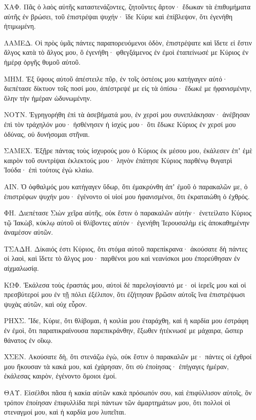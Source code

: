 {\par }{\PP {}ΧΑΦ. Πᾶς ὁ λαὸς αὐτῆς καταστενάζοντες, ζητοῦντες ἄρτον· ἔδωκαν τὰ ἐπιθυμήματα αὐτῆς ἐν βρώσει, τοῦ ἐπιστρέψαι ψυχήν· ἴδε Κύριε καὶ ἐπίβλεψον, ὅτι ἐγενήθη ἠτιμωμένη.
\par }{\PP {}ΛΑΜΕΔ. Οἱ πρὸς ὑμᾶς πάντες παραπορευόμενοι ὁδὸν, ἐπιστρέψατε καὶ ἴδετε εἰ ἔστιν ἄλγος κατὰ τὸ ἄλγος μου, ὃ ἐγενήθη· φθεγξάμενος ἐν ἐμοὶ ἐταπείνωσέ με Κύριος ἐν ἡμέρᾳ ὀργῆς θυμοῦ αὐτοῦ.
\par }{\PP {}ΜΗΜ. Ἐξ ὕψους αὐτοῦ ἀπέστειλε πῦρ, ἐν τοῖς ὀστέοις μου κατήγαγεν αὐτό· διεπέτασε δίκτυον τοῖς ποσί μου, ἀπέστρεψέ με εἰς τὰ ὀπίσω· ἔδωκέ με ἠφανισμένην, ὅλην τὴν ἡμέραν ὠδυνωμένην.
\par }{\PP {}ΝΟΥΝ. Ἐγρηγορήθη ἐπὶ τὰ ἀσεβήματά μου, ἐν χερσί μου συνεπλάκησαν· ἀνέβησαν ἐπὶ τὸν τράχηλόν μου· ἠσθένησεν ἡ ἰσχύς μου· ὅτι ἔδωκε Κύριος ἐν χερσί μου ὀδύνας, οὐ δυνήσομαι στῆναι.
\par }{\PP {}ΣΑΜΕΧ. Ἐξῇρε πάντας τοὺς ἰσχυρούς μου ὁ Κύριος ἐκ μέσου μου, ἐκάλεσεν ἐπʼ ἐμὲ καιρὸν τοῦ συντρίψαι ἐκλεκτούς μου· ληνὸν ἐπάτησε Κύριος παρθένῳ θυγατρὶ Ἰούδα· ἐπὶ τούτοις ἐγὼ κλαίω.
\par }{\PP {}ΑΙΝ. Ὁ ὀφθαλμός μου κατήγαγεν ὕδωρ, ὅτι ἐμακρύνθη ἀπʼ ἐμοῦ ὁ παρακαλῶν με, ὁ ἐπιστρέφων ψυχήν μου· ἐγένοντο οἱ υἱοί μου ἠφανισμένοι, ὅτι ἐκραταιώθη ὁ ἐχθρός.
\par }{\PP {}ΦΗ. Διεπέτασε Σιὼν χεῖρα αὐτῆς, οὐκ ἔστιν ὁ παρακαλῶν αὐτήν· ἐνετείλατο Κύριος τῷ Ἰακὼβ, κύκλῳ αὐτοῦ οἱ θλίβοντες αὐτόν· ἐγενήθη Ἱερουσαλὴμ εἰς ἀποκαθημένην ἀναμέσον αὐτῶν.
\par }{\PP {}ΤΣΑΔΗ. Δίκαιός ἐστι Κύριος, ὅτι στόμα αὐτοῦ παρεπίκρανα· ἀκούσατε δὴ πάντες οἱ λαοὶ, καὶ ἴδετε τὸ ἄλγος μου· παρθένοι μου καὶ νεανίσκοι μου ἐπορεύθησαν ἐν αἰχμαλωσίᾳ.
\par }{\PP {}ΚΩΦ. Ἐκάλεσα τοὺς ἐραστάς μου, αὐτοὶ δὲ παρελογίσαντό με· οἱ ἱερεῖς μου καὶ οἱ πρεσβύτεροί μου ἐν τῇ πόλει ἐξέλιπον, ὅτι ἐζήτησαν βρῶσιν αὐτοῖς ἵνα ἐπιστρέψωσι ψυχὰς αὐτῶν, καὶ οὐχ εὗρον.
\par }{\PP {}ΡΗΧΣ. Ἴδε, Κύριε, ὅτι θλίβομαι, ἡ κοιλία μου ἐταράχθη, καὶ ἡ καρδία μου ἐστράφη ἐν ἐμοὶ, ὅτι παραπικραίνουσα παρεπικράνθην, ἔξωθεν ἠτέκνωσέ με μάχαιρα, ὥσπερ θάνατος ἐν οἴκῳ.
\par }{\PP {}ΧΣΕΝ. Ακούσατε δὴ, ὅτι στενάζω ἐγὼ, οὐκ ἔστιν ὁ παρακαλῶν με· πάντες οἱ ἐχθροί μου ἤκουσαν τὰ κακά μου, καὶ ἐχάρησαν, ὅτι σὺ ἐποίησας· ἐπήγαγες ἡμέραν, ἐκάλεσας καιρὸν, ἐγένοντο ὅμοιοι ἐμοί.
\par }{\PP {}ΘΑΥ. Εἰσέλθοι πᾶσα ἡ κακία αὐτῶν κακὰ πρόσωπόν σου, καὶ ἐπιφύλλισον αὐτοῖς, ὃν τρόπον ἐποίησαν ἐπιφυλλίδα περὶ πάντων τῶν ἁμαρτημάτων μου, ὅτι πολλοὶ οἱ στεναγμοί μου, καὶ ἡ καρδία μου λυπεῖται.

}
